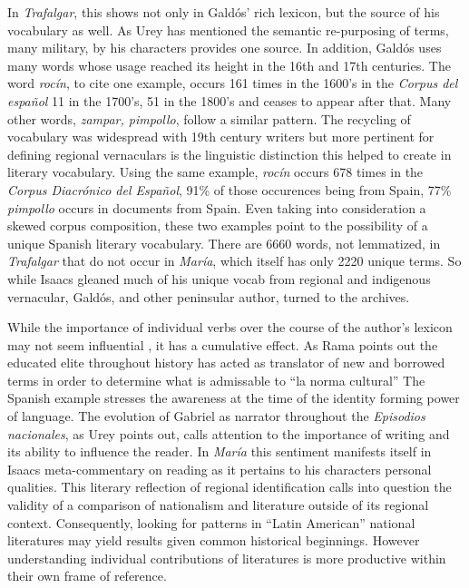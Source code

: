 \documentclass[12pt]{report}
\begin{document}
In \textit{Trafalgar}, this shows not only in Galdós' rich lexicon, but the source of his vocabulary as well. 
As Urey has mentioned the semantic re-purposing of terms, many military, by his characters provides one source.
In addition, Galdós uses many words whose usage reached its height in the 16th and 17th centuries.
The word \textit{rocín}, to cite one example, occurs 161 times in the 1600's in the \textit{Corpus del español} 11 in the 1700's, 51 in the 1800's and ceases to appear after that. 
Many other words, \textit{zampar, pimpollo}, follow a similar pattern.
The recycling of vocabulary was widespread with 19th century writers but more pertinent for defining regional vernaculars is the linguistic distinction this helped to create in literary vocabulary.
Using the same example, \textit{rocín} occurs 678 times in the \textit{Corpus Diacrónico del Español}, 91\% of those occurences being from Spain, 77\% \textit{pimpollo} occurs in documents from Spain. 
Even taking into consideration a skewed corpus composition, these two examples point to the possibility of a unique Spanish literary vocabulary.
There are 6660 words, not lemmatized, in \textit{Trafalgar} that do not occur in \textit{María}, which itself has only 2220 unique terms.
So while Isaacs gleaned much of his unique vocab from regional and indigenous vernacular, Galdós, and other peninsular author, turned to the archives.


While the importance of individual verbs over the course of the author's lexicon may not seem influential , it has a cumulative effect.
As Rama points out the educated elite throughout history has acted as translator of new and borrowed terms in order to determine what is admissable to \enquote{la norma cultural} \cite[50]{Rama2002}
The Spanish example stresses the awareness at the time of the identity forming power of language. The evolution of Gabriel as narrator throughout the \textit{Episodios nacionales}, as Urey points out, calls attention to the importance of writing and its ability to influence the reader. In \textit{María} this sentiment manifests itself in Isaacs meta-commentary on reading as it pertains to his characters personal qualities. This literary reflection of regional identification calls into question the validity of a comparison of nationalism and literature outside of its regional context. Consequently, looking for patterns in \enquote{Latin American} national literatures may yield results given common historical beginnings. However understanding individual contributions of literatures is more productive within their own frame of reference.
\end{document}
